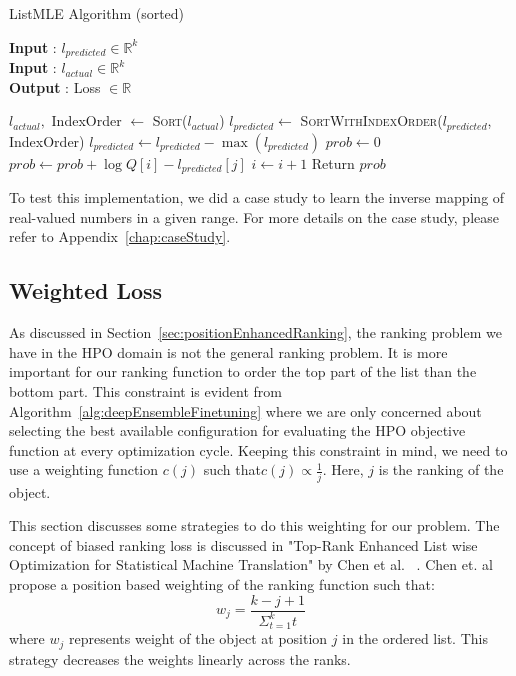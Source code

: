 \documentclass[12pt, twoside, ngerman]{report}
\begin{document}
\begin{algorithm}[h]
\caption{ListMLE Algorithm (sorted)}
\label{alg:listMLESorted}
\hspace*{\algorithmicindent} \textbf{Input} : $l_{predicted} \in \mathbb{R}^k$ \\
\hspace*{\algorithmicindent} \textbf{Input} : $l_{actual} \in \mathbb{R}^k$ \\
\hspace*{\algorithmicindent} \textbf{Output} : Loss $\in \mathbb{R}$
\begin{algorithmic}[1]
\State $l_{actual}, $ IndexOrder $\gets$ \textsc{Sort}($l_{actual}$)
\State $l_{predicted} \gets$ \textsc{SortWithIndexOrder}($l_{predicted}$,  IndexOrder)
\State $l_{predicted} \gets l_{predicted} - \max(l_{predicted})$ 
\State $prob \gets 0$    
        \State $prob \gets prob + \log Q[i] - l_{predicted}[j]$
        \State $i \gets i + 1$
    \EndFor
\State Return $prob$
\EndProcedure
\end{algorithmic}
\end{algorithm}

To test this implementation, we did a case study to learn the inverse mapping of real-valued numbers in a given range.
For more details on the case study, please refer to Appendix~\ref{chap:caseStudy}.

\subsection{Weighted Loss}
As discussed in Section~\ref{sec:positionEnhancedRanking},  the ranking problem we have in the HPO domain is not the general ranking problem.
It is more important for our ranking function to order the top part of the list than the bottom part.
This constraint is evident from Algorithm~\ref{alg:deepEnsembleFinetuning} where we are only concerned about selecting the best available configuration for evaluating the HPO objective function at every optimization cycle.
Keeping this constraint in mind,  we need to use a weighting function $c(j)$ such that$ c(j) \propto \frac{1}{j} $.
Here, $j$ is the ranking of the object.

This section discusses some strategies to do this weighting for our problem.
The concept of biased ranking loss is discussed in "Top-Rank Enhanced List wise Optimization for Statistical Machine Translation" by  Chen et al. ~\cite{TRLWO}.
Chen et. al propose a position based weighting of the ranking function such that:
\begin{equation}
w_j = \frac{k - j + 1}{\Sigma_{t=1}^k t}
\end{equation}
where $w_j$ represents weight of the object at position $j$ in the ordered list.
This strategy decreases the weights linearly across the ranks.
\end{document}
